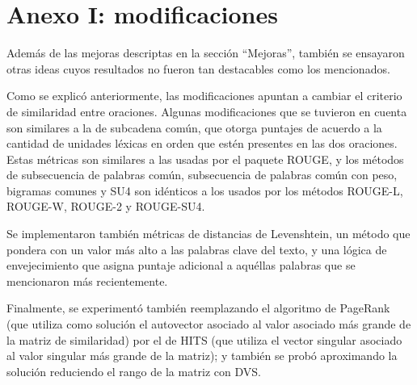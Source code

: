 \documentclass[a4paper]{article}
\begin{document}
\newpage
\section{Anexo I: modificaciones}
Además de las mejoras descriptas en la sección “Mejoras”, también se ensayaron otras ideas cuyos resultados no fueron tan destacables como los mencionados.

Como se explicó anteriormente, las modificaciones apuntan a cambiar el criterio de similaridad entre oraciones. Algunas modificaciones que se tuvieron en cuenta son similares a la de subcadena común, que otorga puntajes de acuerdo a la cantidad de unidades léxicas en orden que estén presentes en las dos oraciones. Estas métricas son similares a las usadas por el paquete ROUGE, y los métodos de subsecuencia de palabras común, subsecuencia de palabras común con peso, bigramas comunes y SU4 son idénticos a los usados por los métodos ROUGE-L, ROUGE-W, ROUGE-2 y ROUGE-SU4.

Se implementaron también métricas de distancias de Levenshtein, un método que pondera con un valor más alto a las palabras clave del texto, y una lógica de envejecimiento que asigna puntaje adicional a aquéllas palabras que se mencionaron más recientemente.

Finalmente, se experimentó también reemplazando el algoritmo de PageRank (que utiliza como solución el autovector asociado al valor asociado más grande de la matriz de similaridad) por el de HITS (que utiliza el vector singular asociado al valor singular más grande de la matriz); y también se probó aproximando la solución reduciendo el rango de la matriz con DVS. 
\end{document}
